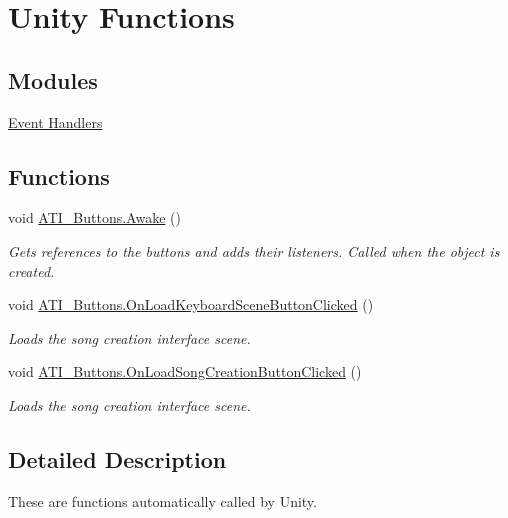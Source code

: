 \hypertarget{group___a_t_i_buttons_unity}{}\section{Unity Functions}
\label{group___a_t_i_buttons_unity}
\subsection*{Modules}
\begin{DoxyCompactItemize}
\item 
\hyperlink{group___a_t_i_buttons_handlers}{Event Handlers}
\end{DoxyCompactItemize}
\subsection*{Functions}
\begin{DoxyCompactItemize}
\item 
void \hyperlink{group___a_t_i_buttons_unity_gaa24ae34a40539dab6595d1713fc77560}{A\+T\+I\+\_\+\+Buttons.\+Awake} ()
\begin{DoxyCompactList}\small\item\em Gets references to the buttons and adds their listeners. Called when the object is created. \end{DoxyCompactList}\item 
void \hyperlink{group___a_t_i_buttons_unity_ga1b9e9b75184e9e26309cc14bda37ad8a}{A\+T\+I\+\_\+\+Buttons.\+On\+Load\+Keyboard\+Scene\+Button\+Clicked} ()
\begin{DoxyCompactList}\small\item\em Loads the song creation interface scene. \end{DoxyCompactList}\item 
void \hyperlink{group___a_t_i_buttons_unity_ga6f6e66c53a80c3bcd9b7e7238a3b82fd}{A\+T\+I\+\_\+\+Buttons.\+On\+Load\+Song\+Creation\+Button\+Clicked} ()
\begin{DoxyCompactList}\small\item\em Loads the song creation interface scene. \end{DoxyCompactList}\end{DoxyCompactItemize}


\subsection{Detailed Description}
These are functions automatically called by Unity. 

